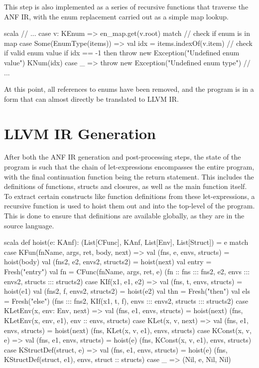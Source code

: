 This step is also implemented as a series of recursive functions that traverse the ANF IR, with the
enum replacement carried out as a simple map lookup.

\begin{code}{scala}
    // ...
    case v: KEnum =>
        en_map.get(v.root) match {
            // check if enum is in map
            case Some(EnumType(items)) =>
                val idx = items.indexOf(v.item)
                // check if valid enum value
                if idx == -1 then
                    throw new Exception("Undefined enum value")
                KNum(idx)
            case _ => throw new Exception("Undefined enum type")
        }
    // ...
\end{code}

At this point, all references to enums have been removed, and the program is in a form that can
almost directly be translated to LLVM IR.

\section{LLVM IR Generation}

After both the ANF IR generation and post-processing steps, the state of the program is such that
the chain of let-expressions encompasses the entire program, with the final continuation function
being the return statement. This includes the definitions of functions, structs and closures, as
well as the main function itself. To extract certain constructs like function definitions from these
let-expressions, a recursive function is used to hoist them out and into the top-level of the
program. This is done to ensure that definitions are available globally, as they are in the source
language.

\begin{code}{scala}
    def hoist(e: KAnf): (List[CFunc], KAnf, List[Env], List[Struct]) = e match {
        case KFun(fnName, args, ret, body, next) => {
            val (fns, e, envs, structs) = hoist(body)
            val (fns2, e2, envs2, structs2) = hoist(next)
            val entry = Fresh("entry")
            val fn = CFunc(fnName, args, ret, e)
            (fn :: fns ::: fns2, e2, envs ::: envs2, structs ::: structs2)
        }
        case KIf(x1, e1, e2) => {
            val (fns, t, envs, structs) = hoist(e1)
            val (fns2, f, envs2, structs2) = hoist(e2)
            val thn = Fresh("then")
            val els = Fresh("else")
            (fns ::: fns2, KIf(x1, t, f), envs ::: envs2, structs ::: structs2)
        }
        case KLetEnv(x, env: Env, next) => {
            val (fns, e1, envs, structs) = hoist(next)
            (fns, KLetEnv(x, env, e1), env :: envs, structs)
        }
        case KLet(x, v, next) => {
            val (fns, e1, envs, structs) = hoist(next)
            (fns, KLet(x, v, e1), envs, structs)
        }
        case KConst(x, v, e) => {
            val (fns, e1, envs, structs) = hoist(e)
            (fns, KConst(x, v, e1), envs, structs)
        }
        case KStructDef(struct, e) => {
            val (fns, e1, envs, structs) = hoist(e)
            (fns, KStructDef(struct, e1), envs, struct :: structs)
        }
        case _ => (Nil, e, Nil, Nil)
    }
\end{code}

